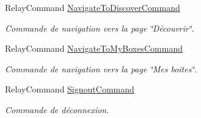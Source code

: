 \begin{DoxyCompactItemize}
Relay\+Command \hyperlink{class_boxes_1_1_view_models_1_1_shell_view_model_abe1ff38e661982f6c4e2e7cdc0036a40}{Navigate\+To\+Discover\+Command}
\begin{DoxyCompactList}\small\item\em Commande de navigation vers la page \char`\"{}\+Découvrir\char`\"{}. \end{DoxyCompactList}\item 
Relay\+Command \hyperlink{class_boxes_1_1_view_models_1_1_shell_view_model_aeb5a287e70df4b7a212e33d5bc59155e}{Navigate\+To\+My\+Boxes\+Command}
\begin{DoxyCompactList}\small\item\em Commande de navigation vers la page \char`\"{}\+Mes boites\char`\"{}. \end{DoxyCompactList}\item 
Relay\+Command \hyperlink{class_boxes_1_1_view_models_1_1_shell_view_model_acd36737e5c5366baa05998f11294d25c}{Signout\+Command}
\begin{DoxyCompactList}\small\item\em Commande de déconnexion. \end{DoxyCompactList}\end{DoxyCompactItemize}
